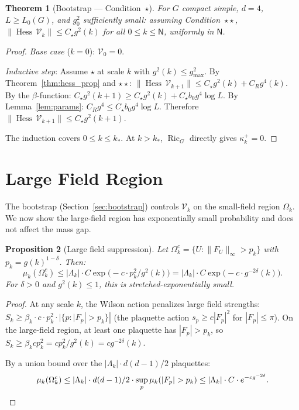 \documentclass[11pt,a4paper]{article}
\theoremstyle{plain}
\newtheorem{theorem}{Theorem}[section]
\newtheorem{proposition}[theorem]{Proposition}
\theoremstyle{definition}
\theoremstyle{remark}
\newcommand{\Hess}{\operatorname{Hess}}
\newcommand{\Ric}{\operatorname{Ric}}
\newcommand{\cV}{\mathcal{V}}
\begin{document}
\begin{theorem}[Bootstrap --- Condition~$\star$]
\label{thm:bootstrap}
For $G$ compact simple, $d = 4$, $L \ge L_0(G)$, and
$g_0^2$ sufficiently small: assuming
Condition~$\star\star$,
$\|\Hess\,\cV_k\|
\le C_\star g^2(k)$ for all $0 \le k \le \mathsf{N}$,
uniformly in $\mathsf{N}$.
\end{theorem}

\begin{proof}
\emph{Base case} ($k = 0$): $\cV_0 = 0$.

\emph{Inductive step}: Assume $\star$ at scale $k$
with $g^2(k) \le g_{\max}^2$.
By Theorem~\ref{thm:hess_prop} and $\star\star$:
$\|\Hess\,\cV_{k+1}\| \le C_\star g^2(k) + C_R g^4(k)$.
By the $\beta$-function:
$C_\star g^2(k+1) \ge C_\star g^2(k) + C_\star b_0 g^4\log L$.
By Lemma~\ref{lem:params}: $C_R g^4 \le C_\star b_0 g^4\log L$.
Therefore $\|\Hess\,\cV_{k+1}\| \le C_\star g^2(k+1)$.

The induction covers $0 \le k \le k_*$. At $k > k_*$,
$\Ric_G$ directly gives $\kappa_k^+ = 0$.
\end{proof}

\section{Large Field Region}\label{sec:large_field}

The bootstrap (Section~\ref{sec:bootstrap}) controls
$\cV_k$ on the small-field region $\Omega_k$. We now
show the large-field region has exponentially small
probability and does not affect the mass gap.

\begin{proposition}[Large field suppression]
\label{prop:large_field}
Let $\Omega_k^c = \{U : \|F_U\|_\infty > p_k\}$
with $p_k = g(k)^{1-\delta}$. Then:
\begin{equation}\label{eq:large_field}
  \mu_k(\Omega_k^c) \le |\Lambda_k| \cdot C
  \exp\!\bigl(-c \cdot p_k^2 / g^2(k)\bigr)
  = |\Lambda_k| \cdot C
  \exp\!\bigl(-c \cdot g^{-2\delta}(k)\bigr).
\end{equation}
For $\delta > 0$ and $g^2(k) \le 1$, this is
stretched-exponentially small.
\end{proposition}

\begin{proof}
At any scale $k$, the Wilson action penalizes large
field strengths: $S_k \ge \beta_k \cdot c \cdot p_k^2
\cdot |\{p : |F_p| > p_k\}|$ (the plaquette action
$s_p \ge c|F_p|^2$ for $|F_p| \le \pi$). On the
large-field region, at least one plaquette has
$|F_p| > p_k$, so $S_k \ge \beta_k c p_k^2 = c p_k^2/g^2(k)
= c g^{-2\delta}(k)$.

By a union bound over the $|\Lambda_k| \cdot d(d-1)/2$
plaquettes:
\begin{equation}
  \mu_k(\Omega_k^c) \le |\Lambda_k| \cdot d(d-1)/2
  \cdot \sup_p \mu_k(|F_p| > p_k)
  \le |\Lambda_k| \cdot C \cdot e^{-c g^{-2\delta}}.
  \qedhere
\end{equation}
\end{proof}
\end{document}
